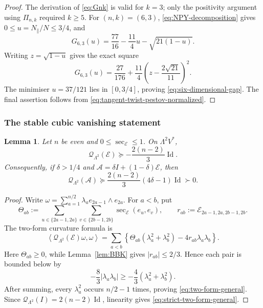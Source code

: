 \documentclass[reqno,11pt]{amsart}
\newtheorem{lemma}[theorem]{Lemma}
\theoremstyle{definition}
\newcommand{\cA}{\mathcal A}
\newcommand{\cQ}{\mathcal Q}
\newcommand{\cE}{\mathcal E}
\newcommand{\Id}{\operatorname{Id}}
\newcommand{\inner}[2]{\left\langle #1,#2\right\rangle}
\begin{document}
\begin{proof}
The derivation of \eqref{eq:Gnk} is valid for $k=3$; only the positivity
argument using $\Pi_{n,k}$ required $k\geq5$.  For $(n,k)=(6,3)$,
\eqref{eq:NPY-decomposition} gives
$0\leq u=N_{\parallel}/N\leq3/4$, and
$$
 G_{6,3}(u)=\frac{77}{16}-\frac{11}{4}u-\sqrt{21(1-u)}.
$$
Writing $z=\sqrt{1-u}$ gives the exact square
$$
 G_{6,3}(u)=\frac{27}{176}
 +\frac{11}{4}\left(z-\frac{2\sqrt{21}}{11}\right)^2.
$$
The minimiser $u=37/121$ lies in $[0,3/4]$, proving
\eqref{eq:six-dimensional-gap}. The final assertion follows from
\eqref{eq:tangent-twist-pestov-normalized}.
\end{proof}

\subsubsection{The stable cubic vanishing statement}

\begin{lemma}\label{lem:two-form-general}
Let $n$ be even and $0\leq\sec_{\cE}\leq1$.  On $\Lambda^2V^*$,
\begin{equation}\label{eq:two-form-general}
  \cQ_{\Lambda^2}(\cE)
  \succeq-\frac{2(n-2)}3\Id.
\end{equation}
Consequently, if $\delta>1/4$ and
$\cA=\delta I+(1-\delta)\cE$, then
\begin{equation}\label{eq:strict-two-form-general}
 \cQ_{\Lambda^2}(\cA)
 \succeq\frac{2(n-2)}3(4\delta-1)\Id\succ0.
\end{equation}
\end{lemma}

\begin{proof}
Write
$\omega=\sum_{a=1}^{n/2}\lambda_a e_{2a-1}\wedge e_{2a}$.
For $a<b$, put
$$
 \Theta_{ab}:=\sum_{u\in\{2a-1,2a\}}
              \sum_{v\in\{2b-1,2b\}}\sec_{\cE}(e_u,e_v),
 \qquad
 r_{ab}:=\cE_{2a-1,2a,2b-1,2b}.
$$
The two-form curvature formula is
\begin{equation*}
 \inner{\cQ_{\Lambda^2}(\cE)\omega}{\omega}
 =\sum_{a<b}\left\{
 \Theta_{ab}(\lambda_a^2+\lambda_b^2)
 -4r_{ab}\lambda_a\lambda_b\right\}.
\end{equation*}
Here $\Theta_{ab}\geq0$, while Lemma~\ref{lem:BBK} gives
$|r_{ab}|\leq2/3$.  Hence each pair is bounded below by
$$
 -\frac83|\lambda_a\lambda_b|
 \geq-\frac43(\lambda_a^2+\lambda_b^2).
$$
After summing, every $\lambda_a^2$ occurs $n/2-1$ times, proving
\eqref{eq:two-form-general}.  Since
$\cQ_{\Lambda^2}(I)=2(n-2)\Id$, linearity gives
\eqref{eq:strict-two-form-general}.
\end{proof}
\end{document}
